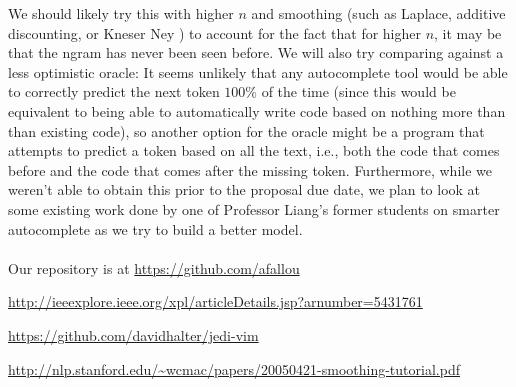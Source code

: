 \documentclass[10.75pt]{article}
\begin{document}
We should likely try this with higher $n$ and smoothing (such as Laplace, additive discounting, or Kneser Ney \cite{smooth}) to account for the fact that for higher $n$, it may be that the ngram has never been seen before.  
We will also try comparing against a less optimistic oracle: It seems unlikely that any autocomplete tool would be able to correctly predict the next token $100\%$ of the time (since this would be equivalent to being able to automatically write code based on nothing more than than existing code), so another option for the oracle might be a program that attempts to predict a token based on all the text, i.e., both the code that comes before and the code that comes after the missing token. Furthermore, while we weren't able to obtain this prior to the proposal due date, we plan to look at some existing work done by one of Professor Liang's former students on smarter autocomplete as we try to build a better model.
\\\\
Our repository is at \url{https://github.com/afallou}

\begin{thebibliography}{9}

 \url{http://ieeexplore.ieee.org/xpl/articleDetails.jsp?arnumber=5431761}

 \url{https://github.com/davidhalter/jedi-vim}

 \url{http://nlp.stanford.edu/~wcmac/papers/20050421-smoothing-tutorial.pdf}

\end{thebibliography}
\end{document}
